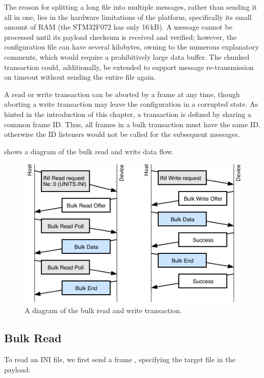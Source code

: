 The reason for splitting a long file into multiple messages, rather than sending it all in one, lies in the hardware limitations of the platform, specifically its small amount of \gls{RAM} (the STM32F072 has only 16\,kB). A message cannot be processed until its payload checksum is received and verified; however, the configuration file can have several kilobytes, owning to the numerous explanatory comments, which would require a prohibitively large data buffer. The chunked transaction could, additionally, be extended to support message re-transmission on timeout without sending the entire file again.

A read or write transaction can be aborted by a frame \CmdBulkAbort at any time, though aborting a write transaction may leave the configuration in a corrupted state. As hinted in the introduction of this chapter, a transaction is defined by sharing a common frame ID. Thus, all frames in a bulk transaction must have the same ID, otherwise the ID listeners would not be called for the subsequent messages.

 shows a diagram of the bulk read and write data flow.

\begin{figure}
	\centering
	\includegraphics[scale=1.5]{img/bulk-read-write.pdf}
	\caption{\label{fig:bulk-rw}A diagram of the bulk read and write transaction.}
\end{figure}

\subsection{Bulk Read}

To read an INI file, we first send a frame \CmdINIRead, specifying the target file in the payload:

